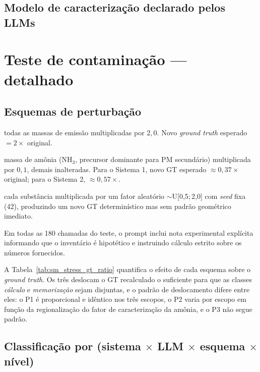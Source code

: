 \documentclass[12pt,a4paper]{article}
\begin{document}
\subsection{Modelo de caracterização declarado pelos LLMs}



\section{Teste de contaminação --- detalhado}
\label{sec:stress}

\subsection{Esquemas de perturbação}

\begin{description}
\setlength\itemsep{0.2em}
\item[P1 (escala uniforme):] todas as massas de emissão multiplicadas por $2{,}0$. Novo \emph{ground truth} esperado $= 2\times$ original.
\item[P2 (amônia atenuada):] massa de amônia (NH$_3$, precursor dominante para PM secundário) multiplicada por $0{,}1$, demais inalteradas. Para o Sistema 1, novo GT esperado $\approx 0{,}37\times$ original; para o Sistema 2, $\approx 0{,}57\times$.
\item[P3 (perturbação aleatória):] cada substância multiplicada por um fator aleatório $\sim$U[0,5;\,2,0] com \emph{seed} fixa (42), produzindo um novo GT determinístico mas sem padrão geométrico imediato.
\end{description}

Em todas as 180 chamadas do teste, o prompt inclui nota experimental explícita informando que o inventário é hipotético e instruindo cálculo estrito sobre os números fornecidos.

A Tabela~\ref{tab:sm_stress_gt_ratio} quantifica o efeito de cada esquema sobre o \emph{ground truth}. Os três deslocam o GT recalculado o suficiente para que as classes \emph{cálculo} e \emph{memorização} sejam disjuntas, e o padrão de deslocamento difere entre eles: o P1 é proporcional e idêntico nos três escopos, o P2 varia por escopo em função da regionalização do fator de caracterização da amônia, e o P3 não segue padrão.



\subsection{Classificação por (sistema $\times$ LLM $\times$ esquema $\times$ nível)}
\end{document}
